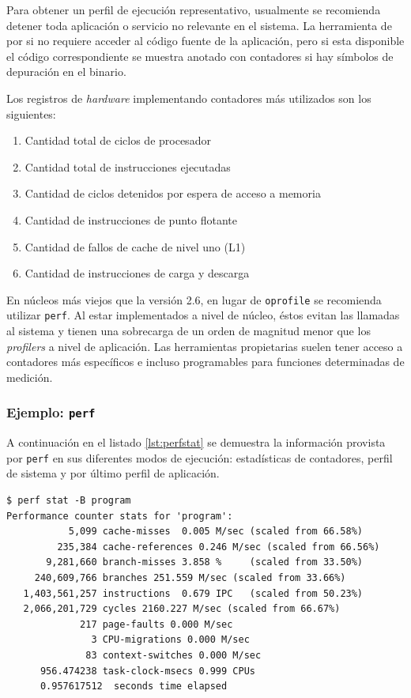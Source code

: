 \documentclass[a4paper]{report}
\begin{document}
\bigskip

Para obtener un perfil de ejecución representativo, usualmente se recomienda detener toda aplicación o servicio no relevante en el sistema. La herramienta de por si no requiere acceder al código fuente de la aplicación, pero si esta disponible el código correspondiente se muestra anotado con contadores si hay símbolos de depuración en el binario.

\bigskip

Los registros de {\it hardware} implementando contadores más utilizados son los
siguientes:

\begin{enumerate}
\item Cantidad total de ciclos de procesador
\item Cantidad total de instrucciones ejecutadas
\item Cantidad de ciclos detenidos por espera de acceso a memoria
\item Cantidad de instrucciones de punto flotante
\item Cantidad de fallos de cache de nivel uno (L1)
\item Cantidad de instrucciones de carga y descarga
\end{enumerate}

En núcleos más viejos que la versión 2.6, en lugar de {\tt oprofile} se recomienda utilizar {\tt perf}. Al estar implementados a nivel de núcleo, éstos evitan las llamadas al sistema y tienen una sobrecarga de un orden de magnitud menor que los {\it profilers} a nivel de aplicación. Las herramientas propietarias suelen tener acceso a contadores más específicos e
incluso programables para funciones determinadas de medición.

\subsubsection{Ejemplo: {\tt perf}}

A continuación en el listado \ref{lst:perfstat} se demuestra la información provista por {\tt perf} en sus diferentes modos de ejecución: estadísticas de contadores, perfil de sistema y por último perfil de aplicación.

\begin{lstlisting}[caption={Estadísticas de Contadores},label={lst:perfstat}]
$ perf stat -B program
Performance counter stats for 'program':
           5,099 cache-misses  0.005 M/sec (scaled from 66.58%)
         235,384 cache-references 0.246 M/sec (scaled from 66.56%)
       9,281,660 branch-misses 3.858 %     (scaled from 33.50%)
     240,609,766 branches 251.559 M/sec (scaled from 33.66%)
   1,403,561,257 instructions  0.679 IPC   (scaled from 50.23%)
   2,066,201,729 cycles 2160.227 M/sec (scaled from 66.67%)
             217 page-faults 0.000 M/sec
               3 CPU-migrations 0.000 M/sec
              83 context-switches 0.000 M/sec
      956.474238 task-clock-msecs 0.999 CPUs
      0.957617512  seconds time elapsed
\end{lstlisting}
\end{document}
